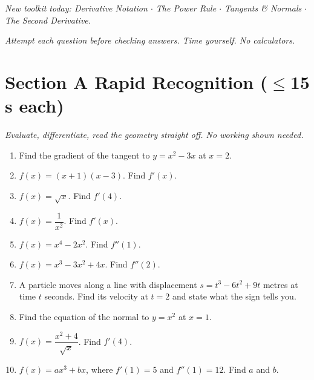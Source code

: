 \documentclass[11pt,a4paper]{article}
\begin{document}
\noindent\textit{New toolkit today: Derivative Notation $\cdot$ The Power Rule $\cdot$ Tangents \& Normals $\cdot$ The Second Derivative.}

\vspace{2pt}
\noindent\textit{Attempt each question before checking answers. Time yourself. No calculators.}

\section*{Section A \quad Rapid Recognition \hfill{\normalfont\small($\leq$15 s each)}}

\noindent\textit{Evaluate, differentiate, read the geometry straight off. No working shown needed.}

\begin{enumerate}

\item Find the gradient of the tangent to $y=x^2-3x$ at $x=2$.

\item $f(x)=(x+1)(x-3)$. Find $f'(x)$.

\item $f(x)=\sqrt{x}$. Find $f'(4)$.

\item $f(x)=\dfrac{1}{x^2}$. Find $f'(x)$.

\item $f(x)=x^4-2x^2$. Find $f''(1)$.

\item $f(x)=x^3-3x^2+4x$. Find $f''(2)$.

\item A particle moves along a line with displacement $s=t^3-6t^2+9t$ metres at time $t$ seconds. Find its velocity at $t=2$ and state what the sign tells you.

\item Find the equation of the normal to $y=x^2$ at $x=1$.

\item $f(x)=\dfrac{x^2+4}{\sqrt{x}}$. Find $f'(4)$.

\item $f(x)=ax^3+bx$, where $f'(1)=5$ and $f''(1)=12$. Find $a$ and $b$.

\end{enumerate}
\end{document}
